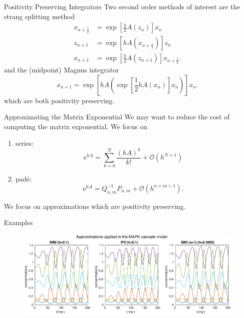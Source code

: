 \documentclass[aspectratio=169]{beamer}
\begin{document}
\begin{frame}{Positivity Preserving Integrators}
	Two second order methods of interest are \pause the strang splitting method
	\begin{equation*}
		\begin{aligned}
			x_{n+\frac{1}{2}} &= \exp \left[ \frac{h}{2} A(z_n) \right] x_n \\
			z_{n+1} &= \exp \left[ h A(x_{n+\frac{1}{2}}) \right] z_n \\
			x_{n+1} &= \exp \left[ \frac{h}{2} A(z_{n+1}) \right] x_{n+\frac{1}{2}}.
		\end{aligned}
		\label{eqn:secondorderstrangsplittingmethod}
	\end{equation*} \pause
	and the (midpoint) Magnus integrator
	\begin{equation*}
		x_{n+1} = \exp\left[h A \left( \exp\left[\frac{1}{2}h A(x_n)\right] x_n \right) \right] x_n.
		\label{eqn:secondordermagnus}
	\end{equation*}
	which are both positivity preserving.
\end{frame}

\begin{frame}{Approximating the Matrix Exponential}
	We may want to reduce the cost of computing the matrix exponential. \pause
	We focus on
	\begin{enumerate}
		\item<2-> series: $$\mathrm{e}^{hA} = \sum_{k=0}^{N} \frac{(hA)^k}{k!} + \mathcal{O}(h^{N+1})$$
		\item<3-> pad\'e: $$\mathrm{e}^{hA} = Q_{n,m}^{-1} P_{n,m} + \mathcal{O}(h^{n+m+1}).$$
	\end{enumerate}\pause[4]
	We focus on approximations which are positivity preserving.
\end{frame}

\begin{frame}{Examples}
	\begin{figure}
		\centering
		\includegraphics[width=\linewidth]{Matlab/magnustriplemapk.eps}
		\label{fig:triplemagnus}
	\end{figure}
\end{frame}
\end{document}
